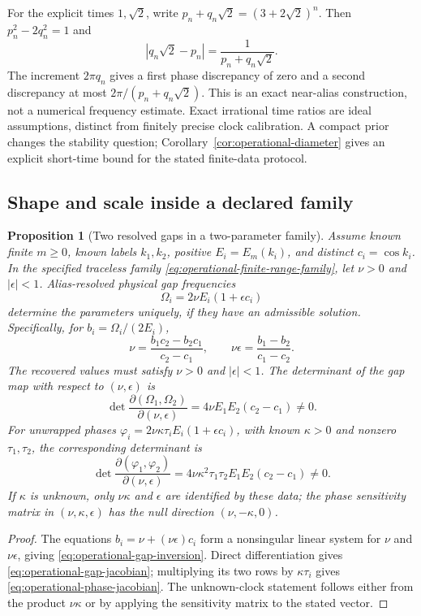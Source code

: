 \documentclass[11pt]{article}
\newtheorem{proposition}[theorem]{Proposition}
\theoremstyle{definition}
\begin{document}
For the explicit times $1,\sqrt2$, write
$p_n+q_n\sqrt2=(3+2\sqrt2)^n$. Then
$p_n^2-2q_n^2=1$ and
\[
 |q_n\sqrt2-p_n|=\frac1{p_n+q_n\sqrt2}.
\]
The increment $2\pi q_n$ gives a first phase discrepancy of zero and
a second discrepancy at most $2\pi/(p_n+q_n\sqrt2)$. This is an exact
near-alias construction, not a numerical frequency estimate. Exact
irrational time ratios are ideal assumptions, distinct from finitely
precise clock calibration. A compact prior changes the stability
question; Corollary~\ref{cor:operational-diameter} gives an explicit
short-time bound for the stated finite-data protocol.

\subsection{Shape and scale inside a declared family}

\begin{proposition}[Two resolved gaps in a two-parameter family]
\label{prop:operational-shape-scale}
Assume known finite $m\ge0$, known labels $k_1,k_2$, positive
$E_i=E_m(k_i)$, and distinct $c_i=\cos k_i$. In the specified traceless
family \eqref{eq:operational-finite-range-family}, let $\nu>0$ and
$|\epsilon|<1$. Alias-resolved physical gap frequencies
\[
 \Omega_i=2\nu E_i(1+\epsilon c_i)
\]
determine the parameters uniquely, if they have an admissible solution.
Specifically, for $b_i=\Omega_i/(2E_i)$,
\begin{equation}
 \nu=\frac{b_1c_2-b_2c_1}{c_2-c_1},\qquad
 \nu\epsilon=\frac{b_1-b_2}{c_1-c_2}.
 \label{eq:operational-gap-inversion}
\end{equation}
The recovered values must satisfy $\nu>0$ and $|\epsilon|<1$.
The determinant of the gap map with respect to $(\nu,\epsilon)$ is
\begin{equation}
 \det\frac{\partial(\Omega_1,\Omega_2)}{\partial(\nu,\epsilon)}
 =4\nu E_1E_2(c_2-c_1)\ne0.
 \label{eq:operational-gap-jacobian}
\end{equation}
For unwrapped phases
$\varphi_i=2\nu\kappa\tau_iE_i(1+\epsilon c_i)$, with known
$\kappa>0$ and nonzero $\tau_1,\tau_2$, the corresponding determinant is
\begin{equation}
 \det\frac{\partial(\varphi_1,\varphi_2)}{\partial(\nu,\epsilon)}
 =4\nu\kappa^2\tau_1\tau_2E_1E_2(c_2-c_1)\ne0.
 \label{eq:operational-phase-jacobian}
\end{equation}
If $\kappa$ is unknown, only $\nu\kappa$ and $\epsilon$ are identified
by these data; the phase sensitivity matrix in $(\nu,\kappa,\epsilon)$
has the null direction $(\nu,-\kappa,0)$.
\end{proposition}
\begin{proof}
The equations $b_i=\nu+(\nu\epsilon)c_i$ form a nonsingular linear
system for $\nu$ and $\nu\epsilon$, giving
\eqref{eq:operational-gap-inversion}. Direct differentiation gives
\eqref{eq:operational-gap-jacobian}; multiplying its two rows by
$\kappa\tau_i$ gives \eqref{eq:operational-phase-jacobian}.
The unknown-clock statement follows either from the product
$\nu\kappa$ or by applying the sensitivity matrix to the stated vector.
\end{proof}
\end{document}
